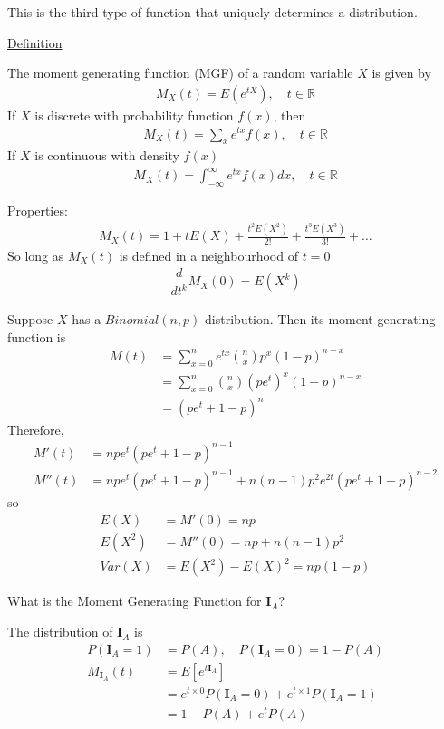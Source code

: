 \documentclass{article}
\begin{document}
This is the third type of function that uniquely determines a distribution. 

\underline{Definition}

The moment generating function (MGF) of a random variable $X$ is given by
\begin{align*}
    M_X(t) = E(e^{tX}), \quad t \in \mathbb{R}
\end{align*}
If $X$ is discrete with probability function $f(x)$, then
\begin{align*}
    M_X(t) = \sum_xe^{tx}f(x), \quad t \in \mathbb{R}
\end{align*}
If $X$ is continuous with density $f(x)$
\begin{align*}
    M_X(t) = \int_{-\infty}^{\infty}e^{tx}f(x)dx, \quad t \in \mathbb{R}
\end{align*}

Properties:
\begin{align*}
    M_X(t) = 1 + tE(X) + \frac{t^2E(X^2)}{2!} + \frac{t^3E(X^3)}{3!} + \ldots
\end{align*}
So long as $M_X(t)$ is defined in a neighbourhood of $t = 0$
\begin{align*}
    \dfrac{d}{dt^k}M_X(0) = E(X^k)
\end{align*}

Suppose $X$ has a $Binomial(n,p)$ distribution. Then its moment generating function is
\begin{align*}
    M(t) &= \sum_{x=0}^n e^{tx}\binom{n}{x}p^x(1-p)^{n-x}\\
    &= \sum_{x=0}^{n}\binom{n}{x}(pe^t)^x(1-p)^{n-x} \\
    &= (pe^t + 1 - p)^n
\end{align*}
Therefore,
\begin{align*}
    M'(t) &= npe^t(pe^t + 1 - p)^{n-1} \\
    M''(t) &= npe^t(pe^t + 1 - p)^{n-1} + n(n-1)p^2e^{2t}(pe^t + 1 - p)^{n-2}
\end{align*}
so
\begin{align*}
    E(X) &= M'(0) = np \\
    E(X^2) &= M''(0) = np + n(n-1)p^2 \\
    Var(X) &= E(X^2) - E(X)^2 = np(1-p)
\end{align*}

What is the Moment Generating Function for $\mathbf{I}_A$?

The distribution of $\mathbf{I}_A$ is
\begin{align*}
    P(\mathbf{I}_A = 1) &= P(A), \quad P(\mathbf{I}_A = 0) = 1 - P(A) \\
    M_{\mathbf{I}_A}(t) &= E[e^{t\mathbf{I}_A}] \\
    &= e^{t \times 0}P(\mathbf{I}_A = 0) + e^{t \times 1}P(\mathbf{I}_A = 1) \\
    &= 1 - P(A) + e^tP(A)
\end{align*}
\end{document}
